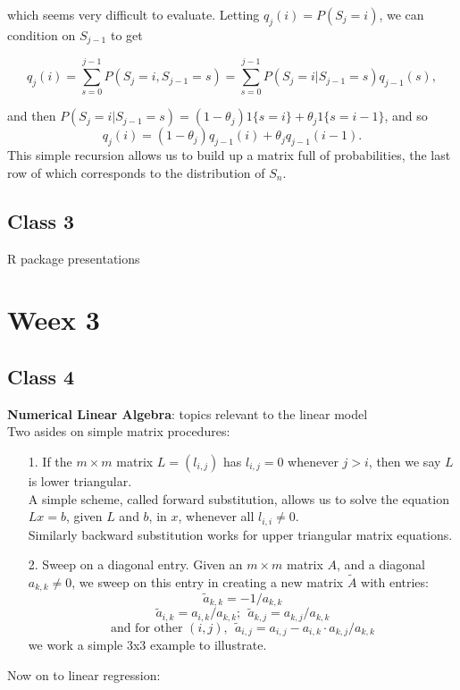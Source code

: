 \documentclass[11pt,a4paper]{article}
\begin{document}
\begin{itemize}
which seems very difficult to evaluate.   Letting $q_j(i) = P(S_j = i)$, we can condition on $S_{j-1}$ to get

$$q_j(i) = \sum_{s=0}^{j-1}  P(S_j = i, S_{j-1} = s )= \sum_{s=0}^{j-1}  P( S_j = i | S_{j-1} = s )  q_{j-1} (s),$$

and then $P(S_j=i | S_{j-1} = s ) = (1-\theta_j) 1\{s=i\} + \theta_j 1\{s=i-1\}$, and so
$$q_j(i) = (1-\theta_j) q_{j-1}(i) + \theta_j q_{j-1}(i-1).$$
This simple recursion allows us to build up a matrix full of probabilities, the last row of which corresponds to the distribution of $S_n$.
\end{itemize}
\subsection*{Class 3}
R package presentations

\section*{Weex 3}
\subsection*{Class 4}
\textbf{Numerical Linear Algebra}: topics relevant to the linear model\\
Two asides on simple matrix procedures:
\begin{itemize}
\item[1.] If the $m\times m$ matrix $L=(l_{i,j})$ has $l_{i,j} = 0$ whenever $j > i$, then we say $L$ is lower triangular.\\
A simple scheme, called forward substitution, allows us to solve the equation $L x = b$, given $L$ and $b$, in $x$, whenever all $l_{i,i} \neq 0$.\\
Similarly backward substitution works for upper triangular matrix equations.
\item[2.] Sweep on a diagonal entry.  Given an $m \times m$ matrix $A$, and a diagonal $a_{k,k} \neq 0$, we sweep on this entry in creating a new matrix $\tilde{A}$ with entries:
$$\tilde{a}_{k,k} = -1/a_{k,k}$$
$$\tilde{a}_{i,k} = a_{i,k}/a_{k,k};~~\tilde{a}_{k,j} = a_{k,j}/a_{k,k}$$
$$\text{and for other }(i,j),~~\tilde{a}_{i,j} = a_{i,j} - a_{i,k}\cdot a_{k,j}/a_{k,k}$$
we work a simple 3x3 example to illustrate.
\end{itemize}
Now on to linear regression:\\
\end{document}
